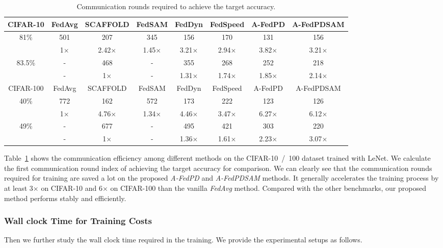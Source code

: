 \begin{table}[h]
\centering
\vspace{-0.2cm}
\caption{Communication rounds required to achieve the target accuracy.}
\vspace{0.05cm}
\small
\renewcommand\arraystretch{1.5}
\begin{tabular}{|c|ccccccc|}
\toprule
CIFAR-10 & FedAvg & SCAFFOLD & FedSAM & FedDyn & FedSpeed & A-FedPD & A-FedPDSAM \\
\midrule
81\% & 501 & 207 & 345 & 156 & 170 & 131 & 156 \\
\cmidrule(lr){2-8}
     & 1$\times$ & 2.42$\times$ & 1.45$\times$ & 3.21$\times$ & 2.94$\times$ & 3.82$\times$ & 3.21$\times$ \\
\midrule
83.5\% & - & 468 & - & 355 & 268 & 252 & 218 \\
\cmidrule(lr){2-8}
       & - & 1$\times$ & - & 1.31$\times$ & 1.74$\times$ & 1.85$\times$ & 2.14$\times$ \\
 \midrule
 CIFAR-100 & FedAvg & SCAFFOLD & FedSAM & FedDyn & FedSpeed & A-FedPD & A-FedPDSAM \\
\midrule
40\% & 772 & 162 & 572 & 173 & 222 & 123 &  126\\
\cmidrule(lr){2-8}
     & 1$\times$ & 4.76$\times$ & 1.34$\times$ & 4.46$\times$ & 3.47$\times$ & 6.27$\times$ & 6.12$\times$ \\
\midrule
49\% & - & 677 & - & 495 & 421 & 303 & 220 \\
\cmidrule(lr){2-8}
     & - & 1$\times$ & - & 1.36$\times$ & 1.61$\times$ & 2.23$\times$ & 3.07$\times$ \\
\bottomrule
\end{tabular}
\label{tb:communication efficiency}
\end{table}

Table~\ref{tb:communication efficiency} shows the communication efficiency among different methods on the CIFAR-10\ /\ 100 dataset trained with LeNet. We calculate the first communication round index of achieving the target accuracy for comparison. We can clearly see that the communication rounds required for training are saved a lot on the proposed \textit{A-FedPD} and \textit{A-FedPDSAM} methods. It generally accelerates the training process by at least 3$\times$ on CIFAR-10 and 6$\times$ on CIFAR-100 than the vanilla \textit{FedAvg} method. Compared with the other benchmarks, our proposed method performs stably and efficiently.

\subsubsection{Wall clock Time for Training Costs}
\label{wall=clock}
Then we further study the wall clock time required in the training. We provide the experimental setups as follows.

